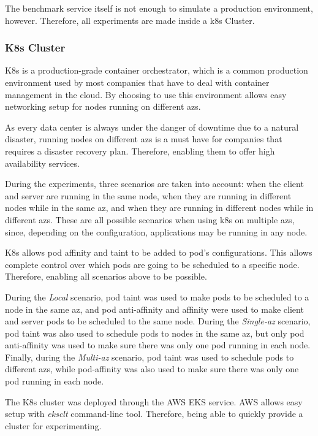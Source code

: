 The benchmark service itself is not enough to simulate a production environment, however. Therefore, all experiments are made inside a \gls{k8s} Cluster.

\subsubsection{K8s Cluster}

K8s is a production-grade container orchestrator, which is a common production environment used by most companies that have to deal with container management in the cloud. By choosing to use this environment allows easy networking setup for nodes running on different \gls{az}s. 

As every data center is always under the danger of downtime due to a natural disaster, running nodes on different \gls{az}s is a must have for companies that requires a disaster recovery plan. Therefore, enabling them to offer high availability services.

During the experiments, three scenarios are taken into account: when the client and server are running in the same node, when they are running in different nodes while in the same \gls{az}, and when they are running in different nodes while in different \gls{az}s. These are all possible scenarios when using \gls{k8s} on multiple \gls{az}s, since, depending on the configuration, applications may be running in any node.

K8s allows pod affinity and taint to be added to pod's configurations. This allows complete control over which pods are going to be scheduled to a specific node. Therefore, enabling all scenarios above to be possible.

During the \textit{Local} scenario, pod taint was used to make pods to be scheduled to a node in the same \gls{az}, and pod anti-affinity and affinity were used to make client and server pods to be scheduled to the same node. During the \textit{Single-\gls{az}} scenario, pod taint was also used to schedule pods to nodes in the same \gls{az}, but only pod anti-affinity was used to make sure there was only one pod running in each node. Finally, during the \textit{Multi-\gls{az}} scenario, pod taint was used to schedule pods to different \gls{az}s, while pod-affinity was also used to make sure there was only one pod running in each node.

The K8s cluster was deployed through the AWS EKS service. AWS allows easy setup with \textit{eksclt} command-line tool. Therefore, being able to quickly provide a cluster for experimenting.

